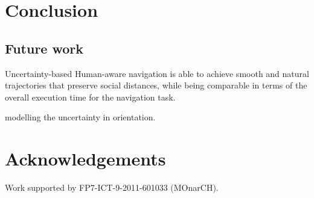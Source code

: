 \section{Conclusion}
\label{sec:conclusion}

\subsection{Future work}


Uncertainty-based Human-aware navigation is able to achieve smooth and natural trajectories that preserve social distances, while being comparable in terms of the overall execution time for the navigation task.
   

modelling the uncertainty in orientation.


\section*{Acknowledgements}

Work supported by FP7-ICT-9-2011-601033 (MOnarCH).